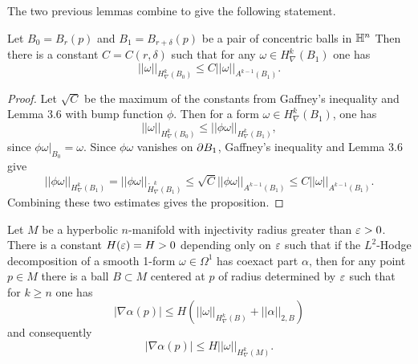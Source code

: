 The two previous lemmas combine to give the following statement.
\begin{prop} \label{prop: 3.7} 
Let $B_0 = B_r(p)$ and $B_1= B_{r+\delta}(p)$ be a pair of concentric balls in $\mathbb H^n$ Then there is a constant $C = C(r,\delta)$ such that for any $\omega \in H^k_{\nabla}(B_1)$ one has $$||\omega||_{H^k_{\nabla}(B_0)}\leq C||\omega||_{A^{k-1}(B_1)}.$$
\end{prop}
\begin{proof}
Let $\sqrt{C}$ be the maximum of the constants from Gaffney’s inequality and Lemma 3.6 with bump function $\phi$. Then for a form $\omega \in H^k_{\nabla}(B_1)$, one has $$||\omega||_{H^k_{\nabla}(B_0)}\leq ||\phi\omega||_{H^k_{\nabla}(B_1)},$$ since $\phi\omega|_{B_0} = \omega.$
Since $\phi\omega$ vanishes on $\partial B_1$, Gaffney’s inequality and Lemma 3.6 give $$||\phi\omega||_{H^k_{\nabla}(B_1)} = ||\phi\omega||_{\mathring{H}^k_{\nabla}(B_1)}\leq \sqrt{C} ||\phi\omega||_{A^{k-1}(B_1)}\leq C||\omega||_{A^{k-1}(B_1)}.$$ Combining these two estimates gives the proposition.
\end{proof}

\begin{prop}\label{prop: 3.8} 
Let $M$ be a hyperbolic $n$-manifold with injectivity radius greater than $\varepsilon>0$. There is a constant $H(\varepsilon) = H >0$ depending only on $\varepsilon$ such that if the $L^2$-Hodge decomposition of a smooth 1-form $\omega\in \Omega^1$ has coexact part $\alpha$, then for any point $p\in M$ there is a ball $B\subset M$ centered at $p$ of radius determined by $\varepsilon$ such that for $k\geq n$ one has $$|
\nabla \alpha(p)|\leq H\left(||\omega||_{H^k_{\nabla}(B)} + ||\alpha||_{2,B}\right)$$ and consequently $$|
\nabla \alpha(p)|\leq H||\omega||_{H^k_{\nabla}(M)}.$$
\end{prop}

